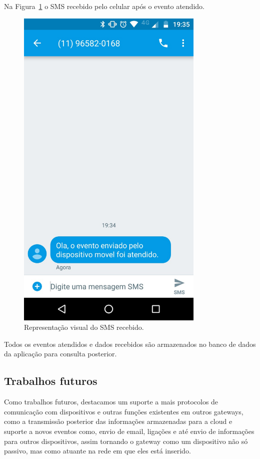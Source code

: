Na Figura~\ref{fig:smsRecebido2} o SMS recebido pelo celular após o evento atendido.
\begin{figure}[h!]
	\begin{center}
		\includegraphics[width=0.8\textwidth]{./img/smsRecebido2}
		\caption{Representação visual do SMS recebido.}
		\label{fig:smsRecebido2}
	\end{center}
\end{figure}

Todos os eventos atendidos e dados recebidos são armazenados no banco de dados da aplicação para consulta posterior.

\subsection{Trabalhos futuros}
\label{trabalhosFuturos}

Como trabalhos futuros, destacamos um suporte a mais protocolos de comunicação com dispositivos e outras funções existentes em outros gateways, como a transmissão posterior das informações armazenadas para a cloud e suporte a novos eventos como, envio de email, ligações e até envio de informações para outros dispositivos, assim tornando o gateway como um dispositivo não só passivo, mas como atuante na rede em que eles está inserido.





